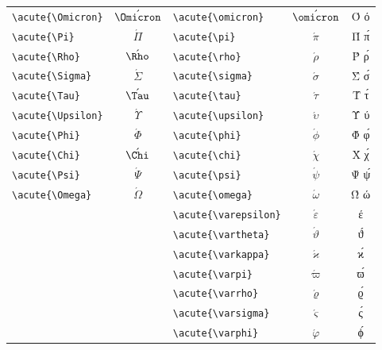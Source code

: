 \documentclass[12pt,a4paper]{article}
\begin{document}
\begin{longtable}{|l|c|l|c|c|}
\verb|\acute{\Omicron}|    & $\acute{\Omicron}$ & \verb|\acute{\omicron}|    & $\acute{\omicron}$    & Ό ό \\
\verb|\acute{\Pi}|         & $\acute{\Pi}$      & \verb|\acute{\pi}|         & $\acute{\pi}$         & Π́ π́ \\
\verb|\acute{\Rho}|        & $\acute{\Rho}$     & \verb|\acute{\rho}|        & $\acute{\rho}$        & Ρ́ ρ́ \\
\verb|\acute{\Sigma}|      & $\acute{\Sigma}$   & \verb|\acute{\sigma}|      & $\acute{\sigma}$      & Σ́ σ́ \\
\verb|\acute{\Tau}|        & $\acute{\Tau}$     & \verb|\acute{\tau}|        & $\acute{\tau}$        & Τ́ τ́ \\
\verb|\acute{\Upsilon}|    & $\acute{\Upsilon}$ & \verb|\acute{\upsilon}|    & $\acute{\upsilon}$    & Ύ ύ \\
\verb|\acute{\Phi}|        & $\acute{\Phi}$     & \verb|\acute{\phi}|        & $\acute{\phi}$        & Φ́ φ́ \\
\verb|\acute{\Chi}|        & $\acute{\Chi}$     & \verb|\acute{\chi}|        & $\acute{\chi}$        & Χ́ χ́ \\
\verb|\acute{\Psi}|        & $\acute{\Psi}$     & \verb|\acute{\psi}|        & $\acute{\psi}$        & Ψ́ ψ́ \\
\verb|\acute{\Omega}|      & $\acute{\Omega}$   & \verb|\acute{\omega}|      & $\acute{\omega}$      & Ώ ώ \\
                           &                    & \verb|\acute{\varepsilon}| & $\acute{\varepsilon}$ & έ \\
                           &                    & \verb|\acute{\vartheta}|   & $\acute{\vartheta}$   & ϑ́ \\
                           &                    & \verb|\acute{\varkappa}|   & $\acute{\varkappa}$   & ϰ́ \\
                           &                    & \verb|\acute{\varpi}|      & $\acute{\varpi}$      & ϖ́ \\
                           &                    & \verb|\acute{\varrho}|     & $\acute{\varrho}$     & ϱ́ \\
                           &                    & \verb|\acute{\varsigma}|   & $\acute{\varsigma}$   & ς́ \\
                           &                    & \verb|\acute{\varphi}|     & $\acute{\varphi}$     & ϕ́ \\
\hline
\end{longtable}
\end{document}
